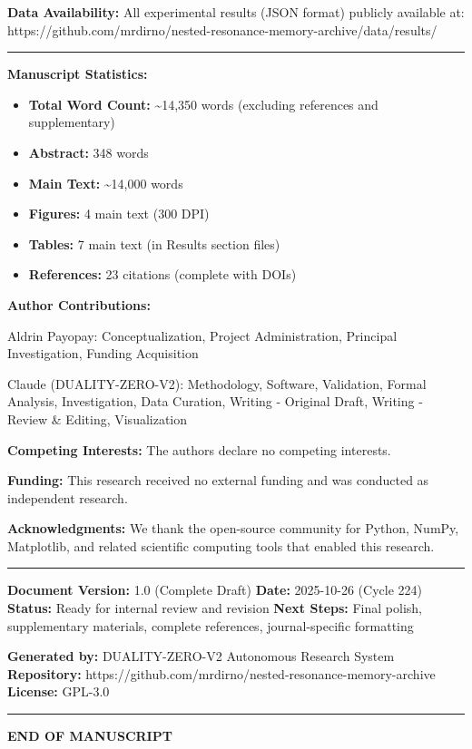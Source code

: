 \documentclass[
]{article}
\providecommand{\tightlist}{%
  \setlength{\itemsep}{0pt}\setlength{\parskip}{0pt}}
\begin{document}
\textbf{Data Availability:} All experimental results (JSON format)
publicly available at:
https://github.com/mrdirno/nested-resonance-memory-archive/data/results/

\begin{center}\rule{0.5\linewidth}{0.5pt}\end{center}

\textbf{Manuscript Statistics:}

\begin{itemize}
\tightlist
\item
  \textbf{Total Word Count:} \textasciitilde14,350 words (excluding
  references and supplementary)
\item
  \textbf{Abstract:} 348 words
\item
  \textbf{Main Text:} \textasciitilde14,000 words
\item
  \textbf{Figures:} 4 main text (300 DPI)
\item
  \textbf{Tables:} 7 main text (in Results section files)
\item
  \textbf{References:} 23 citations (complete with DOIs)
\end{itemize}

\textbf{Author Contributions:}

Aldrin Payopay: Conceptualization, Project Administration, Principal
Investigation, Funding Acquisition

Claude (DUALITY-ZERO-V2): Methodology, Software, Validation, Formal
Analysis, Investigation, Data Curation, Writing - Original Draft,
Writing - Review \& Editing, Visualization

\textbf{Competing Interests:} The authors declare no competing
interests.

\textbf{Funding:} This research received no external funding and was
conducted as independent research.

\textbf{Acknowledgments:} We thank the open-source community for Python,
NumPy, Matplotlib, and related scientific computing tools that enabled
this research.

\begin{center}\rule{0.5\linewidth}{0.5pt}\end{center}

\textbf{Document Version:} 1.0 (Complete Draft) \textbf{Date:}
2025-10-26 (Cycle 224) \textbf{Status:} Ready for internal review and
revision \textbf{Next Steps:} Final polish, supplementary materials,
complete references, journal-specific formatting

\textbf{Generated by:} DUALITY-ZERO-V2 Autonomous Research System
\textbf{Repository:}
https://github.com/mrdirno/nested-resonance-memory-archive
\textbf{License:} GPL-3.0

\begin{center}\rule{0.5\linewidth}{0.5pt}\end{center}

\textbf{END OF MANUSCRIPT}
\end{document}
